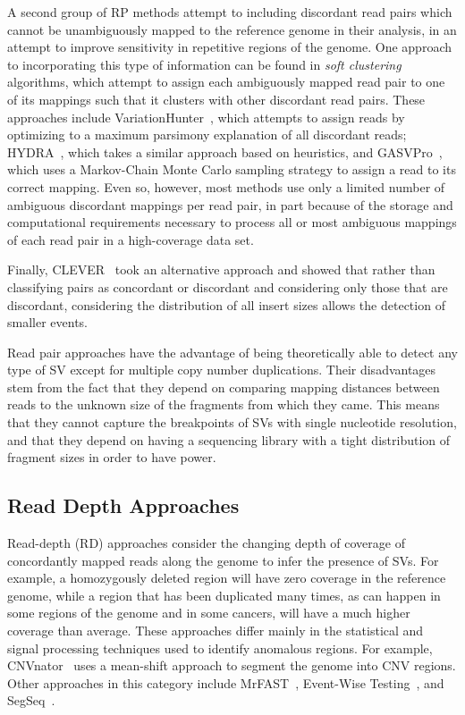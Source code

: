 \documentclass [11pt] {report}
\begin{document}
A second group of RP methods attempt to including discordant read pairs which cannot be unambiguously mapped to the reference genome in their analysis, in an attempt to improve sensitivity in repetitive regions of the genome. One approach to incorporating this type of information can be found in \emph{soft clustering} algorithms, which attempt to assign each ambiguously mapped read pair to one of its mappings such that it clusters with other discordant read pairs. These approaches include VariationHunter~\cite{Hormozdiari:2009p284}, which attempts to assign reads by optimizing to a maximum parsimony explanation of all discordant reads; HYDRA~\cite{Quinlan:2010gf}, which takes a similar approach based on heuristics, and GASVPro~\cite{Sindi:2012kk}, which uses a Markov-Chain Monte Carlo sampling strategy to assign a read to its correct mapping. Even so, however, most methods use only a limited number of ambiguous discordant mappings per read pair, in part because of the storage and computational requirements necessary to process all or most ambiguous mappings of each read pair in a high-coverage data set.

Finally, CLEVER~\cite{Marschall:2012ek} took an alternative approach and showed that rather than classifying pairs as concordant or discordant and considering only those that are discordant, considering the distribution of all insert sizes allows the detection of smaller events. 

Read pair approaches have the advantage of being theoretically able to detect any type of SV except for multiple copy number duplications. Their disadvantages stem from the fact that they depend on comparing mapping distances between reads to the unknown size of the fragments from which they came. This means that they cannot capture the breakpoints of SVs with single nucleotide resolution, and that they depend on having a sequencing library with a tight distribution of fragment sizes in order to have power.

\subsection{Read Depth Approaches}

Read-depth (RD) approaches consider the changing depth of coverage of concordantly mapped reads along the genome to infer the presence of SVs. For example, a homozygously deleted region will have zero coverage in the reference genome, while a region that has been duplicated many times, as can happen in some regions of the genome and in some cancers, will have a much higher coverage than average. These approaches differ mainly in the statistical and signal processing techniques used to identify anomalous regions. For example, CNVnator~\cite{Abyzov:2011bk} uses a mean-shift approach to segment the genome into CNV regions. Other approaches in this category include MrFAST~\cite{Alkan:2009cr}, Event-Wise Testing~\cite{Yoon:2009kb}, and SegSeq~\cite{Chiang:2009di}.
\end{document}
